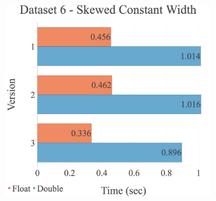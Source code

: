 \begin{figure}[H]
\begin{adjustwidth}{-2cm}{-2cm}
\begin{subfigure}{.62\textwidth}
\end{subfigure}
\par\bigskip
\par\bigskip
\centering
\begin{subfigure}{.62\textwidth}
  \includegraphics[width=1\textwidth]{img/experiments/multi-versions-6_SKEWEDCONSTWIDTH.png}
\end{subfigure}
\end{adjustwidth}
\end{figure}



